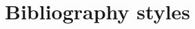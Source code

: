 \documentclass[3p,twocolumn]{elsarticle}
\begin{document}
\section{Bibliography styles}
\label{Bibliography styles}


%

%






%










\end{document}
